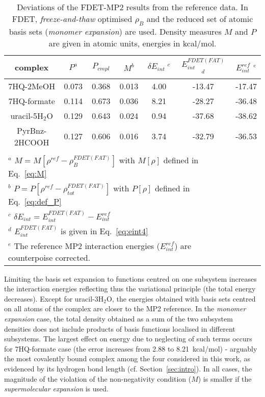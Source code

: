 \documentclass[amsmath,amssymb,preprint,aip,jcp]{revtex4-1}
\newcommand{\nr}[1]{\color{red}#1\color{black}}
\begin{document}
\begin{table*}
{
\begin{center}
\begin{tabular}{|c|c|c|c|c|c|c|}
\hline
 complex & $P^a$ & $P_{cmpl}$ & $M^b$ & $\delta E_{int}\;^c$&$E^{FDET(FAT)}_{int}$ $^d$ &$E_{int}^{ref}$ $^e$ \\ \hline
7HQ-2MeOH & 0.073 & 0.368 & 0.013 & 4.00 & -13.47 & -17.47 \\ \hline
7HQ-formate & 0.114 & 0.673 & 0.036 &  8.21 & -28.27 & -36.48 \\ \hline
uracil-5H$_2$O & 0.129 & 0.643 & 0.024 & 0.94 & -37.68 & -38.62 \\ \hline
PyrBnz-2HCOOH  & 0.127 & 0.606 & 0.016  & 3.74 & -32.79 &  -36.53 \\ \hline
\multicolumn{6}{c}{ } \\
\multicolumn{6}{l}{$^a$ $M=M[\rho^{ref} - \rho^{FDET(FAT)}_{B}]$ with $M[\rho]$ defined in Eq.~\ref{eq:M}}\\
\multicolumn{6}{l}{$^b$ $P=P[\rho^{ref} - \rho_{tot}^{FDET(FAT)}]$ with $P[\rho]$ defined in Eq.~\ref{eq:def_P}}\\
\multicolumn{6}{l}{$^c$ $\delta E_{int}=E^{FDET(FAT)}_{int}-E_{int}^{ref}$} \\
\multicolumn{6}{l}{$^d$ $E^{FDET(FAT)}_{int}$ is given in Eq.~\ref{eq:eint4}}\\
\multicolumn{6}{l}{$^e$ The reference MP2 interaction energies ($E_{int}^{ref}$) are \nr{counterpoise } corrected.}
\end{tabular}
\end{center}
}%
\caption{Deviations of the FDET-MP2 results from the reference data.  In FDET, \textit{freeze-and-thaw} optimised $\rho_B$ and the reduced set of atomic basis sets ({\it monomer expansion}) are used. Density measures $M$ and $P$ are given in atomic units, energies in kcal/mol.
}
\label{table:ME_FAT}
\end{table*}

Limiting the basis set expansion to functions centred on one subsystem increases the interaction energies reflecting thus the variational principle (the total energy decreases). Except for uracil-3H$_2$O, the energies obtained with basis sets centred on all atoms of the complex are closer to the MP2 reference. In the {\it monomer expansion} case, the total density obtained as a sum of \nr{the } two subsystem densities
does not include products of basis function\nr{s } localised in different subsystems. The largest effect on energy due to neglecting of such terms occurs for 7HQ-formate case (the error increases from 2.88 to 8.21~kcal/mol) - arguably the most covalently bound complex among the four considered in this work\nr{, as evidenced by its hydrogen bond length (cf. Section~\ref{sec:intro})}. In all cases, the magnitude of the violation of the non-negativity condition ($M$)  is smaller if the {\it supermolecular expansion} is used. 
\end{document}
